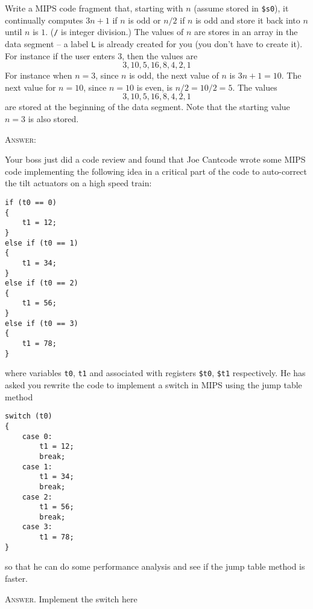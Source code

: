 \newpage
\nextq
Write a MIPS code fragment that, starting with $n$ (assume stored in
\verb!$s0!),
it
continually computes $3n + 1$ if $n$ is odd or $n/2$
if $n$ is odd
and store it back into $n$ until $n$ is $1$.
(\verb!/! is integer division.)
The values of $n$ are stores in an array in the data segment --
a label \verb!L! is already created for you (you don't have to create it).
For instance if the user
enters $3$, then the values are
\[
  3, 10, 5, 16, 8, 4, 2, 1
\]
For instance when $n = 3$, since $n$ is odd,
the next value of $n$ is $3n + 1 = 10$.
The next value for $n = 10$, since $n = 10$ is even,
is $n / 2 = 10 / 2 = 5$.
The values
\[
  3, 10, 5, 16, 8, 4, 2, 1
\]
are stored at the beginning of the data
segment.
Note that the starting value $n = 3$ is also stored.

\textsc{Answer:}
\begin{answercode}

\end{answercode}

\newpage
\nextq
Your boss just did a code review and found that Joe Cantcode
wrote some MIPS code implementing the following idea
in a critical part of the code to auto-correct
the tilt actuators on a high speed train:
\begin{Verbatim}[frame=single]
if (t0 == 0)
{
    t1 = 12;
}
else if (t0 == 1)
{
    t1 = 34;
}
else if (t0 == 2)
{
    t1 = 56;
}
else if (t0 == 3)
{
    t1 = 78;
}
\end{Verbatim}
where variables 
\verb!t0!,
\verb!t1!
and associated with registers
\verb!$t0!,
\verb!$t1!
respectively.
He has asked you rewrite the code to implement a switch 
in MIPS using the
jump table method 
\begin{Verbatim}[frame=single]
switch (t0)
{
    case 0:
        t1 = 12;
        break;
    case 1:
        t1 = 34;
        break;
    case 2:
        t1 = 56;
        break;
    case 3:
        t1 = 78;
}
\end{Verbatim}
so that he can do some 
performance analysis and see if the jump table method is faster.

\textsc{Answer.}
Implement the switch here


